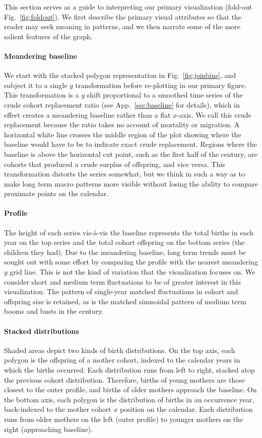 This section serves as a guide to interpreting our primary visualization (fold-out Fig.~\ref{fig:foldout}). We first describe the primary visual attributes so that the reader may seek meaning in patterns, and we then narrate some of the more salient features of the graph.

\paragraph{Meandering baseline} We start with the stacked polygon representation in Fig.~\ref{fig:joinbins}, and subject it to a single $y$ transformation before re-plotting in our primary figure. This transformation is a $y$ shift proportional to a smoothed time series of the crude cohort replacement ratio (see App.~\ref{sec:baseline} for details), which in effect creates a meandering baseline rather than a flat $x$-axis. We call this crude replacement because the ratio takes no account of mortality or migration. A horizontal white line crosses the middle region of the plot showing where the baseline would have to be to indicate exact crude replacement. Regions where the baseline is above the horizontal cut point, such as the first half of the  century, are cohorts that produced a crude surplus of offspring, and vice versa. This transformation distorts the series somewhat, but we think in such a way as to make long term macro patterns more visible without losing the ability to compare proximate points on the calendar.

\paragraph{Profile} The height of each series vis-\`a-vis the baseline represents the total births in each year on the top series and the total cohort offspring on the bottom series (the children they had). Due to the meandering baseline, long term trends must be sought out with some effort by comparing the profile with the nearest meandering $y$ grid line. This is not the kind of variation that the visualization focuses on. We consider short and medium term fluctuations to be of greater interest in this visualization. The pattern of single-year matched fluctuations in cohort and offspring size is retained, as is the matched sinusoidal pattern of medium term booms and busts in the  century.

\paragraph{Stacked distributions} Shaded areas depict two kinds of birth distributions. On the top axis, each polygon is the offspring of a mother cohort, indexed to the calendar years in which the births occurred. Each distribution runs from left to right, stacked atop the previous cohort distribution. Therefore, births of young mothers are those closest to the outer profile, and births of older mothers approach the baseline. On the bottom axis, each polygon is the distribution of births in an occurrence year, back-indexed to the mother cohort $x$ position on the calendar. Each distribution runs from older mothers on the left (outer profile) to younger mothers on the right (approaching baseline).


